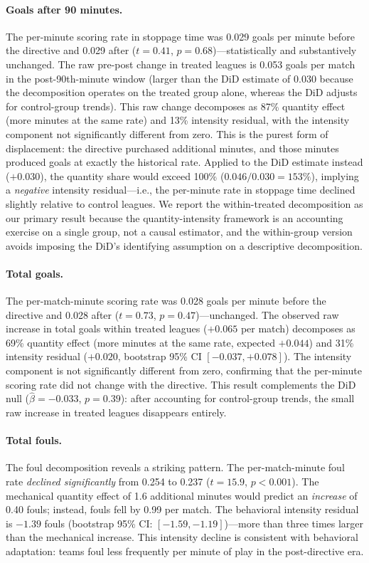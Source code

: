 \documentclass[12pt]{article}
\begin{document}
\paragraph{Goals after 90 minutes.} The per-minute scoring rate in stoppage time was 0.029 goals per minute before the directive and 0.029 after ($t = 0.41$, $p = 0.68$)---statistically and substantively unchanged. The raw pre-post change in treated leagues is 0.053 goals per match in the post-90th-minute window (larger than the DiD estimate of 0.030 because the decomposition operates on the treated group alone, whereas the DiD adjusts for control-group trends). This raw change decomposes as 87\% quantity effect (more minutes at the same rate) and 13\% intensity residual, with the intensity component not significantly different from zero. This is the purest form of displacement: the directive purchased additional minutes, and those minutes produced goals at exactly the historical rate. Applied to the DiD estimate instead ($+0.030$), the quantity share would exceed 100\% ($0.046/0.030 = 153\%$), implying a \emph{negative} intensity residual---i.e., the per-minute rate in stoppage time declined slightly relative to control leagues. We report the within-treated decomposition as our primary result because the quantity-intensity framework is an accounting exercise on a single group, not a causal estimator, and the within-group version avoids imposing the DiD's identifying assumption on a descriptive decomposition.

\paragraph{Total goals.} The per-match-minute scoring rate was 0.028 goals per minute before the directive and 0.028 after ($t = 0.73$, $p = 0.47$)---unchanged. The observed raw increase in total goals within treated leagues ($+0.065$ per match) decomposes as 69\% quantity effect (more minutes at the same rate, expected $+0.044$) and 31\% intensity residual ($+0.020$, bootstrap 95\% CI $[-0.037, +0.078]$). The intensity component is not significantly different from zero, confirming that the per-minute scoring rate did not change with the directive. This result complements the DiD null ($\hat{\beta} = -0.033$, $p = 0.39$): after accounting for control-group trends, the small raw increase in treated leagues disappears entirely.

\paragraph{Total fouls.} The foul decomposition reveals a striking pattern. The per-match-minute foul rate \emph{declined significantly} from 0.254 to 0.237 ($t = 15.9$, $p < 0.001$). The mechanical quantity effect of 1.6 additional minutes would predict an \emph{increase} of 0.40 fouls; instead, fouls fell by 0.99 per match. The behavioral intensity residual is $-1.39$ fouls (bootstrap 95\% CI: $[-1.59, -1.19]$)---more than three times larger than the mechanical increase. This intensity decline is consistent with behavioral adaptation: teams foul less frequently per minute of play in the post-directive era.
\end{document}
